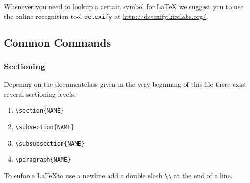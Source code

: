 \documentclass[10pt,a4paper]{scrartcl}
\begin{document}
Whenever you need to lookup a certain symbol for \LaTeX\xspace we suggest you to use
the online recognition tool \texttt{detexify} at \url{http://detexify.kirelabs.org/}.


\subsection{Common Commands}
\subsubsection{Sectioning}
Depening on the documentclass given in the very beginning of this file there
exist several sectioning levels:
\begin{enumerate}
	\item{} \verb$\section{NAME}$
	\item{} \verb$\subsection{NAME}$
	\item{} \verb$\subsubsection{NAME}$
	\item{} \verb$\paragraph{NAME}$
\end{enumerate}

\noindent To enforce \LaTeX to use a newline add a double slash \verb$\\$ at 
the end of a line.
\end{document}
